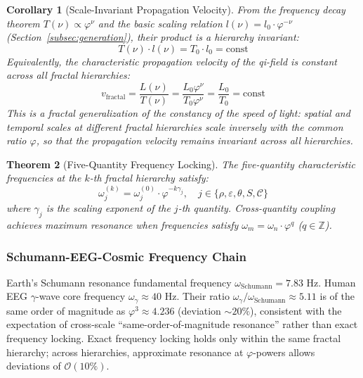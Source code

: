 \documentclass[12pt,a4paper,twocolumn]{article}
\renewcommand{\phi}{\varphi}
\newtheorem{theorem}{Theorem}[section]
\newtheorem{corollary}[theorem]{Corollary}
\begin{document}
\begin{corollary}[Scale-Invariant Propagation Velocity]
\label{cor:scale_invariant_velocity}
From the frequency decay theorem $T(\nu) \propto \phi^{\nu}$ and the basic scaling relation $l(\nu) = l_0 \cdot \phi^{-\nu}$ (Section~\ref{subsec:generation}), their product is a hierarchy invariant:
\begin{equation}
T(\nu) \cdot l(\nu) = T_0 \cdot l_0 = \text{const}
\end{equation}
Equivalently, the characteristic propagation velocity of the qi-field is constant across all fractal hierarchies:
\begin{equation}
v_{\text{fractal}} = \frac{L(\nu)}{T(\nu)} = \frac{L_0 \phi^{\nu}}{T_0 \phi^{\nu}} = \frac{L_0}{T_0} = \text{const}
\end{equation}
This is a fractal generalization of the constancy of the speed of light: spatial and temporal scales at different fractal hierarchies scale inversely with the common ratio $\phi$, so that the propagation velocity remains invariant across all hierarchies.
\end{corollary}

\begin{theorem}[Five-Quantity Frequency Locking]
The five-quantity characteristic frequencies at the $k$-th fractal hierarchy satisfy:
\begin{equation}
\omega_j^{(k)} = \omega_j^{(0)} \cdot \phi^{-k\gamma_j}, \quad j \in \{\rho, \varepsilon, \theta, S, \mathcal{C}\}
\end{equation}
where $\gamma_j$ is the scaling exponent of the $j$-th quantity. Cross-quantity coupling achieves maximum resonance when frequencies satisfy $\omega_m = \omega_n \cdot \phi^q$ ($q \in \mathbb{Z}$).
\end{theorem}

\subsubsection{Schumann-EEG-Cosmic Frequency Chain}

Earth's Schumann resonance fundamental frequency $\omega_{\text{Schumann}} = 7.83$ Hz.
Human EEG $\gamma$-wave core frequency $\omega_\gamma \approx 40$ Hz.
Their ratio $\omega_\gamma / \omega_{\text{Schumann}} \approx 5.11$ is of the same order of magnitude as $\phi^3 \approx 4.236$ (deviation $\sim 20\%$), consistent with the expectation of cross-scale ``same-order-of-magnitude resonance'' rather than exact frequency locking. Exact frequency locking holds only within the same fractal hierarchy; across hierarchies, approximate resonance at $\phi$-powers allows deviations of $\mathcal{O}(10\%)$.
\end{document}
